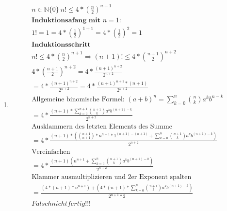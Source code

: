 \documentclass{article}
\begin{document}
\begin{enumerate}[label = (\alph*)]
            \item
                \begin{gather*}
                    n \in \mathbb{N}\{0\} \: n! \leq 4 * { \left( \frac{n}{2} \right) }^{n+1} \\
                    \textbf{Induktionsafang mit } n=1: \\
                    1! = 1 = 4 * {\left( \frac{1}{2} \right) }^{1+1} = 4 * {\left( \frac{1}{2} \right)}^{2} = 1 \\
                    \textbf{Induktionsschritt} \\
                    n! \leq 4 * {\left( \frac{n}{2} \right) }^{n+1} \Rightarrow (n+1)! \leq 4 * {\left( \frac{n+1}{2} \right) }^{n+2} \\
                    4 * { \left( \frac{n+1}{2} \right) }^{n+2} = 4 * \frac{{(n+1)}^{n+2}}{2^{n+2}} \\
                    = 4 * \frac{{(n+1)}^{n+2}}{2^{n+2}} = 4 * \frac{{(n+1)}^{n+1} * (n+1) }{2^{n+2}} \\
                    \text{Allgemeine binomische Formel: } {(a + b)}^{n} = \sum_{k=0}^{n} {n \choose k} a^k b^{n-k} \\
                    = 4 * \frac{(n+1) * \sum_{k=0}^{n+1} {n+1 \choose k} a^k b^{(n+1)-k} }{2^{n+2}} \\
                    \text{Ausklammern des letzten Elements des Summe} \\
                    = 4 * \frac{(n+1) * ({n+1 \choose n+1} * n^{n+1} * 1 ^{(n+1)-(n+1)} + \sum_{k=0}^{n} {n+1 \choose k} a^k b^{(n+1)-k}) } {2^{n+2}} \\
                    \text{Vereinfachen} \\
                    = 4 * \frac{(n+1) ( n^{n+1} + \sum_{k=0}^{n} {n+1 \choose k} a^k b^{(n+1)-k}) }{2^{n+2}} \\
                    \text{Klammer ausmultiplizieren und 2er Exponent spalten} \\
                    = \frac{(4 * (n+1) * n^{n+1}) + (4 * (n+1) * \sum_{k=0}^{n} {n+1 \choose k} a^k b^{(n+1)-k}) }{2^{n+1} * 2} \\
                    Falsch nicht fertig!!!
                \end{gather*}
        \end{enumerate}
\end{document}
